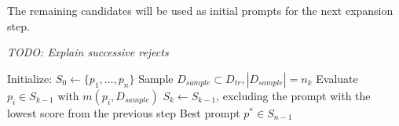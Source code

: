 The remaining candidates will be used as initial prompts for the next expansion step.

\textit{TODO: Explain successive rejects}

\begin{algorithm}
\caption{}
\begin{algorithmic}[1]
    \State Initialize: $S_0 \gets \{p_1, \dots , p_n\}$
        \State Sample $D_{sample} \subset D_{tr}, |D_{sample}| = n_k$
        \State Evaluate $p_i \in S_{k−1}$ with $m(p_i, D_{sample})$
        \State $S_k \gets S_{k−1}$, excluding the prompt with the lowest score from the previous step
    \EndFor
    \State \Return Best prompt $p^* \in S_{n-1}$
\end{algorithmic}
\end{algorithm}